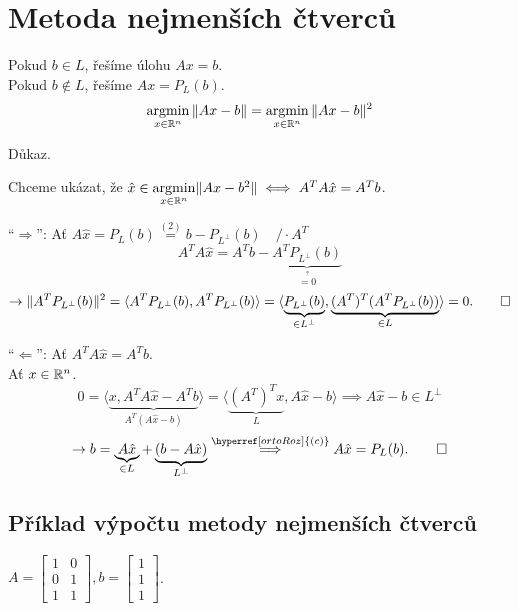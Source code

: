 \section{Metoda nejmenších čtverců}

\begin{multicols}{2}

\columnbreak
    Pokud $b \in L$, řešíme úlohu $Ax = b$. \\Pokud $b \not\in L$, řešíme $Ax = P_L (b)$.
    \[
        \operatorname*{argmin}_{x \in \mathbb{R}^n} \| Ax - b\| = \operatorname*{argmin}_{x \in \mathbb{R}^n} \| Ax - b\|^2
    \]
\end{multicols}
Důkaz.

Chceme ukázat, že $\hat x \in \underset{x \in \mathbb{R}^n}{\operatorname*{argmin}} \| Ax - b^2\| \iff A^T A \hat x = A^T b$.

\enquote{$\Rightarrow$}: Ať $A \hat x = P_L (b) \stackrel{\hyperref[varNer]{(2)}}{=} b - P_{L^\perp} (b) \quad / \cdot A^T$
\[
    A^T A \hat x = A^T  b - \underbrace{A^T P_{L^\perp} (b)}_{\stackrel{?}{=0}}
\]
\[
    \rightarrow \| A^T P_{L^\perp} (b)\|^2 = \langle A^T P_{L^\perp} (b), A^T P_{L^\perp} (b)\rangle = 
    \langle \underbrace{P_{L^\perp} (b)}_{\in L^\perp}, \underbrace{(A^T)^T (A^T P_{L^\perp} (b))}_{\in L}\rangle = 0. \qed
\]

\enquote{$\Leftarrow$}: Ať $A^T A \hat x = A^T b$.\\
Ať $x \in \mathbb{R}^n$.
\[
    0 = \langle \underbrace{x, A^T A \hat x - A^T b}_{A^T (A \hat x - b)}\rangle = 
    \langle \underbrace{(A^T)^T x}_L, A \hat x - b\rangle \implies A \hat x - b \in L^\perp
\]
\[
    \rightarrow b = \underbrace{A \hat x}_{\in L} + \underbrace{(b-A \hat x)}_{L^\perp} 
    \stackrel{\hyperref[ortoRoz]{(c)}}{\implies} A \hat x = P_L (b). \qed
\]

\subsection{Příklad výpočtu metody nejmenších čtverců}
$
A=
\begin{bmatrix}
    1 & 0 \\
    0 & 1 \\
    1 & 1
\end{bmatrix},
b=
\begin{bmatrix}
    1 \\
    1 \\
    1 
\end{bmatrix}$.

